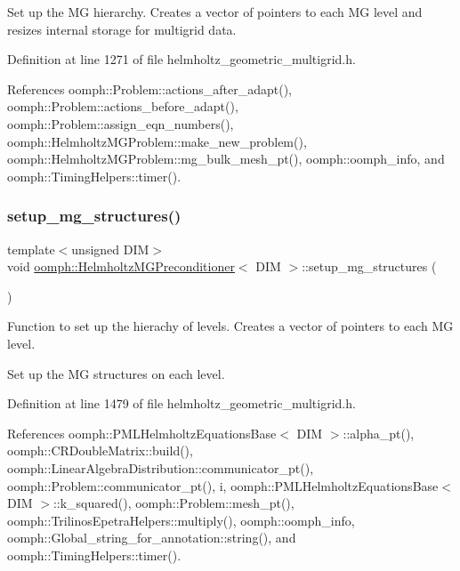 Set up the MG hierarchy. Creates a vector of pointers to each MG level and resizes internal storage for multigrid data. 

Definition at line 1271 of file helmholtz\+\_\+geometric\+\_\+multigrid.\+h.



References oomph\+::\+Problem\+::actions\+\_\+after\+\_\+adapt(), oomph\+::\+Problem\+::actions\+\_\+before\+\_\+adapt(), oomph\+::\+Problem\+::assign\+\_\+eqn\+\_\+numbers(), oomph\+::\+Helmholtz\+M\+G\+Problem\+::make\+\_\+new\+\_\+problem(), oomph\+::\+Helmholtz\+M\+G\+Problem\+::mg\+\_\+bulk\+\_\+mesh\+\_\+pt(), oomph\+::oomph\+\_\+info, and oomph\+::\+Timing\+Helpers\+::timer().

\mbox{\label{classoomph_1_1HelmholtzMGPreconditioner_a4285eee67bbf57ae00ca2aada2744743}} 
\subsubsection{\texorpdfstring{setup\+\_\+mg\+\_\+structures()}{setup\_mg\_structures()}}
{\footnotesize\ttfamily template$<$unsigned D\+IM$>$ \\
void \hyperlink{classoomph_1_1HelmholtzMGPreconditioner}{oomph\+::\+Helmholtz\+M\+G\+Preconditioner}$<$ D\+IM $>$\+::setup\+\_\+mg\+\_\+structures (\begin{DoxyParamCaption}{ }\end{DoxyParamCaption})\hspace{0.3cm}{\ttfamily [private]}}



Function to set up the hierachy of levels. Creates a vector of pointers to each MG level. 

Set up the MG structures on each level. 

Definition at line 1479 of file helmholtz\+\_\+geometric\+\_\+multigrid.\+h.



References oomph\+::\+P\+M\+L\+Helmholtz\+Equations\+Base$<$ D\+I\+M $>$\+::alpha\+\_\+pt(), oomph\+::\+C\+R\+Double\+Matrix\+::build(), oomph\+::\+Linear\+Algebra\+Distribution\+::communicator\+\_\+pt(), oomph\+::\+Problem\+::communicator\+\_\+pt(), i, oomph\+::\+P\+M\+L\+Helmholtz\+Equations\+Base$<$ D\+I\+M $>$\+::k\+\_\+squared(), oomph\+::\+Problem\+::mesh\+\_\+pt(), oomph\+::\+Trilinos\+Epetra\+Helpers\+::multiply(), oomph\+::oomph\+\_\+info, oomph\+::\+Global\+\_\+string\+\_\+for\+\_\+annotation\+::string(), and oomph\+::\+Timing\+Helpers\+::timer().

